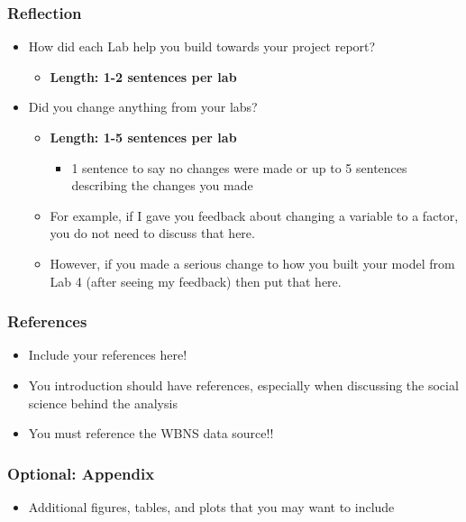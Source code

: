 \documentclass[
  letterpaper,
  DIV=11,
  numbers=noendperiod]{scrartcl}
\providecommand{\tightlist}{%
  \setlength{\itemsep}{0pt}\setlength{\parskip}{0pt}}\usepackage{longtable,booktabs,array}
\begin{document}
\hypertarget{reflection}{%
\subsubsection{Reflection}\label{reflection}}

\begin{itemize}
\tightlist
\item
  How did each Lab help you build towards your project report?

  \begin{itemize}
  \tightlist
  \item
    \textbf{Length: 1-2 sentences per lab}
  \end{itemize}
\item
  Did you change anything from your labs?

  \begin{itemize}
  \tightlist
  \item
    \textbf{Length: 1-5 sentences per lab}

    \begin{itemize}
    \tightlist
    \item
      1 sentence to say no changes were made or up to 5 sentences
      describing the changes you made
    \end{itemize}
  \item
    For example, if I gave you feedback about changing a variable to a
    factor, you do not need to discuss that here.
  \item
    However, if you made a serious change to how you built your model
    from Lab 4 (after seeing my feedback) then put that here.
  \end{itemize}
\end{itemize}

\hypertarget{references}{%
\subsubsection{References}\label{references}}

\begin{itemize}
\tightlist
\item
  Include your references here!
\item
  You introduction should have references, especially when discussing
  the social science behind the analysis
\item
  You must reference the WBNS data source!!
\end{itemize}

\hypertarget{optional-appendix}{%
\subsubsection{Optional: Appendix}\label{optional-appendix}}

\begin{itemize}
\tightlist
\item
  Additional figures, tables, and plots that you may want to include
\end{itemize}
\end{document}
